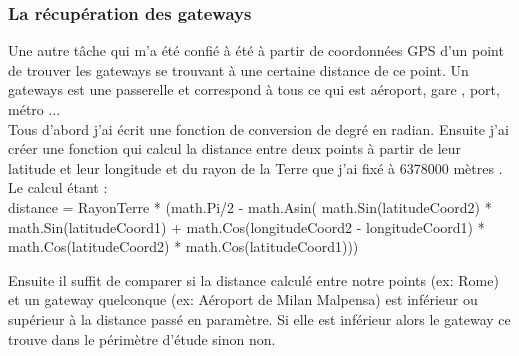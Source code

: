 \documentclass[12pt,a4paper]{report}
\begin{document}
\subsubsection{La récupération des  gateways}

Une autre tâche qui m'a été confié à été à partir de coordonnées GPS d'un point de trouver les gateways se trouvant à une certaine distance de ce point. Un gateways est une passerelle et correspond à tous ce qui est aéroport, gare , port, métro ...\\

Tous d'abord j'ai écrit une fonction de conversion de degré en radian. Ensuite j'ai créer une fonction qui calcul la distance entre deux points à partir de leur latitude et leur longitude et du rayon de la Terre que j'ai fixé à 6378000 mètres .\\

Le calcul étant :\\

distance = RayonTerre * (math.Pi/2 - math.Asin( math.Sin(latitudeCoord2) * math.Sin(latitudeCoord1) + math.Cos(longitudeCoord2 - longitudeCoord1) * math.Cos(latitudeCoord2) * math.Cos(latitudeCoord1)))

Ensuite il suffit de comparer si la distance calculé entre notre points (ex: Rome) et un gateway quelconque (ex: Aéroport de Milan Malpensa)  est inférieur ou supérieur à la distance passé en paramètre. Si elle est inférieur alors le gateway ce trouve dans le périmètre d'étude sinon non.
\end{document}
